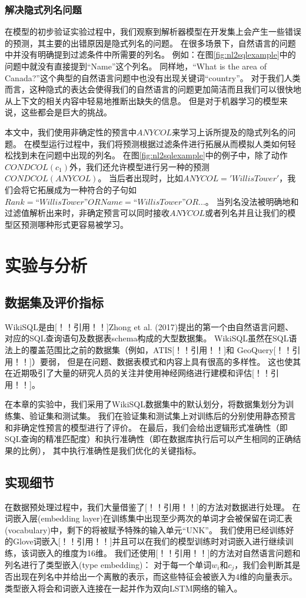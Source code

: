\subsubsection{解决隐式列名问题}
\label{enl2sql:icn}
在模型的初步验证实验过程中，我们观察到解析器模型在开发集上会产生一些错误的预测，其主要的出错原因是隐式列名的问题。
在很多场景下，自然语言的问题中并没有明确提到过滤条件中所需要的列名。
例如：在图\ref{fig:nl2sqlexample}中的问题中就没有直接提到“Name”这个列名。
同样地，“What is the area of Canada?”这个典型的自然语言问题中也没有出现关键词“country”。
对于我们人类而言，这种隐式的表达会使得我们的自然语言的问题更加简洁而且我们可以很快地从上下文的相关内容中轻易地推断出缺失的信息。
但是对于机器学习的模型来说，这些都会是巨大的挑战。

本文中，我们使用非确定性的预言中$ANYCOL$来学习上诉所提及的隐式列名的问题。
在模型运行过程中，我们将预测根据过滤条件进行拓展从而模拟人类如何轻松找到未在问题中出现的列名。
在图\ref{fig:nl2sqlexample}中的例子中，除了动作$CONDCOL(c_1)$外，我们还允许模型进行另一种的预测$CONDCOL(ANYCOL)$。
当后者出现时，比如$ANYCOL='Willis Tower'$，我们会将它拓展成为一种符合的子句如$Rank=“Willis Tower” OR Name=“Willis Tower” OR ...$。
当列名没法被明确地和过滤值解析出来时，非确定预言可以同时接收$ANYCOL$或者列名并且让我们的模型区预测哪种形式更容易被学习。




\section{实验与分析}
\subsection{数据集及评价指标}
WikiSQL是由[！！引用！！]Zhong et al. (2017)提出的第一个由自然语言问题、对应的SQL查询语句及数据表schema构成的大型数据集。
WikiSQL虽然在SQL语法上的覆盖范围比之前的数据集（例如，ATIS[！！引用！！]和 GeoQuery[！！引用！！]）要弱，
但是在问题、数据表模式和内容上具有很高的多样性。
这也使其在近期吸引了大量的研究人员的关注并使用神经网络进行建模和评估[！！引用！！]。

在本章的实验中，我们采用了WikiSQL数据集中的默认划分，将数据集划分为训练集、验证集和测试集。
我们在验证集和测试集上对训练后的分别使用静态预言和非确定性预言的模型进行了评价。
在最后，我们会给出逻辑形式准确性（即SQL查询的精准匹配度）和执行准确性（即在数据库执行后可以产生相同的正确结果的比例），
其中执行准确性是我们优化的关键指标。


\subsection{实现细节}
在数据预处理过程中，我们大量借鉴了[！！引用！！]的方法对数据进行处理。
在词嵌入层(embedding layer)在训练集中出现至少两次的单词才会被保留在词汇表(vocabulary)中，剩下的将被赋予特殊的输入单元“UNK”。
我们使用已经训练好的Glove词嵌入[！！引用！！]并且可以在我们的模型训练时对词嵌入进行继续训练，该词嵌入的维度为16维。
我们还使用[！！引用！！]的方法对自然语言问题和列名进行了类型嵌入(type embedding)：
对于每一个单词$w_i$和$c_j$，我们会判断其是否出现在列名中并给出一个离散的表示，而这些特征会被嵌入为4维的向量表示。
类型嵌入将会和词嵌入连接在一起并作为双向LSTM网络的输入。

